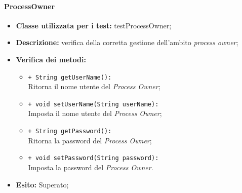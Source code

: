 \paragraph{ProcessOwner}
\begin{flushleft}
\begin{itemize}
\item \textbf{Classe utilizzata per i test:} testProcessOwner;
\item \textbf{Descrizione:} verifica della corretta gestione dell'ambito \textit{process owner};
\item \textbf{Verifica dei metodi:}
\begin{sloppypar}
\begin{itemize}
\item \texttt{+ String getUserName():}\\ Ritorna il nome utente del \textit{Process Owner};
\item \texttt{+ void setUserName(String userName):}\\ Imposta il nome utente del \textit{Process Owner};
\item \texttt{+ String getPassword():}\\ Ritorna la password del \textit{Process Owner};
\item \texttt{+ void setPassword(String password):}\\ Imposta la password del \textit{Process Owner}. 
\end{itemize}
\end{sloppypar}
\item \textbf{Esito:} Superato;
\end{itemize}
\end{flushleft}